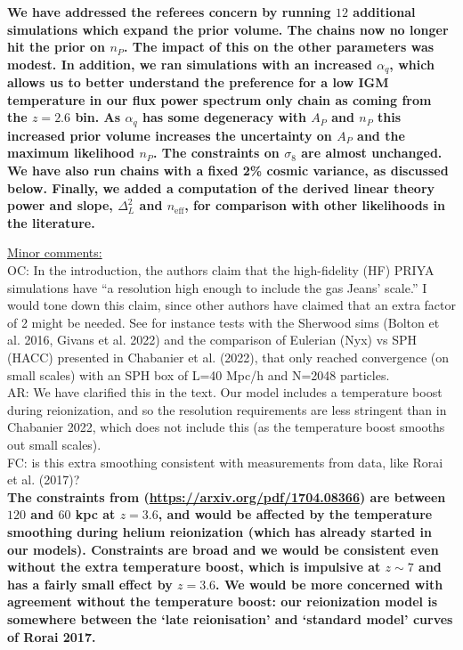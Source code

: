 \documentclass[12pt]{article}
\begin{document}
\textbf{We have addressed the referees concern by running $12$ additional simulations which expand the prior volume. The chains now no longer hit the prior on $n_P$. The impact of this on the other parameters was modest. In addition, we ran simulations with an increased $\alpha_q$, which allows us to better understand the preference for a low IGM temperature in our flux power spectrum only chain as coming from the $z=2.6$ bin. As $\alpha_q$ has some degeneracy with $A_P$ and $n_P$ this increased prior volume increases the uncertainty on $A_P$ and the maximum likelihood $n_P$. The constraints on $\sigma_8$ are almost unchanged. We have also run chains with a fixed 2\% cosmic variance, as discussed below. Finally, we added a computation of the derived linear theory power and slope, $\Delta_L^2$ and $n_\mathrm{eff}$, for comparison with other likelihoods in the literature.}\\

\hrulefill \newline

\underline{Minor comments:}\\

OC: In the introduction, the authors claim that the high-fidelity (HF) PRIYA simulations have “a resolution high enough to include the gas Jeans’ scale.” I would tone down this claim, since other authors have claimed that an extra factor of 2 might be needed. See for instance tests with the Sherwood sims (Bolton et al. 2016, Givans et al. 2022) and the comparison of Eulerian (Nyx) vs SPH (HACC) presented in Chabanier et al. (2022), that only reached convergence (on small scales) with an SPH box of L=40 Mpc/h and N=2048 particles.\\

AR: We have clarified this in the text. Our model includes a temperature boost during reionization, and so the resolution requirements are less stringent than in Chabanier 2022, which does not include this (as the temperature boost smooths out small scales).\\

FC: is this extra smoothing consistent with measurements from data, like Rorai et al. (2017)?\\

\textbf{The constraints from (\url{https://arxiv.org/pdf/1704.08366}) are between $120$ and $60$ kpc at $z=3.6$, and would be affected by the temperature smoothing during helium reionization (which has already started in our models). Constraints are broad and we would be consistent even without the extra temperature boost, which is impulsive at $z \sim 7$ and has a fairly small effect by $z=3.6$. We would be more concerned with agreement without the temperature boost: our reionization model is somewhere between the `late reionisation' and `standard model' curves of Rorai 2017.}\\
\end{document}
